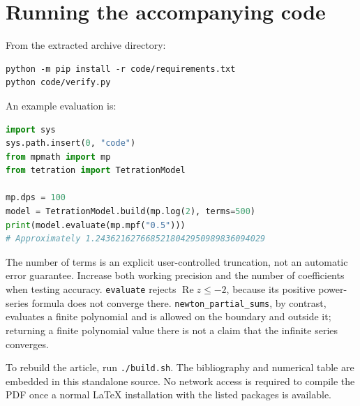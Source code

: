 \documentclass[11pt,letterpaper]{article}
\theoremstyle{definition}\newtheorem{definition}[theorem]{Definition}
\theoremstyle{remark}\newtheorem{remark}[theorem]{Remark}
\newcommand{\Ree}{\operatorname{Re}}
\numberwithin{equation}{section}
\begin{document}
\section{Running the accompanying code}
From the extracted archive directory:
\begin{lstlisting}
python -m pip install -r code/requirements.txt
python code/verify.py
\end{lstlisting}
An example evaluation is:
\begin{lstlisting}[language=Python]
import sys
sys.path.insert(0, "code")
from mpmath import mp
from tetration import TetrationModel

mp.dps = 100
model = TetrationModel.build(mp.log(2), terms=500)
print(model.evaluate(mp.mpf("0.5")))
# Approximately 1.2436216276685218042950989836094029
\end{lstlisting}
The number of terms is an explicit user-controlled truncation, not an automatic error guarantee. Increase both working precision and the number of coefficients when testing accuracy. \texttt{evaluate} rejects $\Ree z\leq-2$, because its positive power-series formula does not converge there. \texttt{newton\_partial\_sums}, by contrast, evaluates a finite polynomial and is allowed on the boundary and outside it; returning a finite polynomial value there is not a claim that the infinite series converges.

To rebuild the article, run \texttt{./build.sh}. The bibliography and numerical table are embedded in this standalone source. No network access is required to compile the PDF once a normal LaTeX installation with the listed packages is available.
\end{document}
